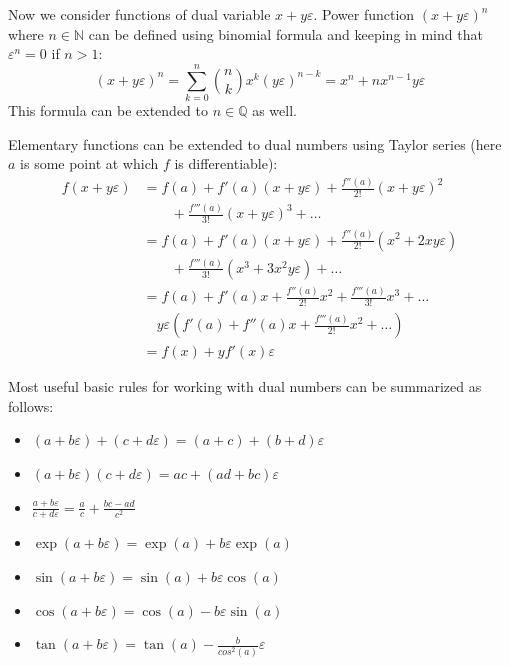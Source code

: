 \documentclass[preprint]{elsarticle}
\begin{document}
Now we consider functions of dual variable $x + y\varepsilon$. Power function
$(x + y\varepsilon)^n$ where $n \in \mathbb{N}$ can be defined using binomial
formula and keeping in mind that $\varepsilon^n = 0$ if $n>1$:
\begin{equation}
  (x + y\varepsilon)^n = \sum_{k=0}^n \binom{n}{k} x^k (y\varepsilon)^{n-k} =
  x^n + n x^{n-1} y \varepsilon
\end{equation}
This formula can be extended to $n \in \mathbb{Q}$ as well.

Elementary functions can be extended to dual numbers using Taylor series (here
$a$ is some point at which $f$ is differentiable):
\begin{equation}
  \begin{aligned}
    f(x + y\varepsilon) &= f(a) + f'(a)(x + y\varepsilon) + \frac{f''(a)}{2!}(x + y\varepsilon)^2 \\
    & \qquad + \frac{f'''(a)}{3!}(x + y\varepsilon)^3 + \dots \\
    &= f(a) + f'(a)(x + y\varepsilon) + \frac{f''(a)}{2!}(x^2 + 2xy\varepsilon) \\
    & \qquad + \frac{f'''(a)}{3!}(x^3 + 3x^2y\varepsilon) + \dots \\
    &= f(a) + f'(a)x + \frac{f''(a)}{2!}x^2 + \frac{f'''(a)}{3!}x^3 + \dots \\
    & \quad y\varepsilon(f'(a) + f''(a)x + \frac{f'''(a)}{2!}x^2 + \dots) \\
    &= f(x) + yf'(x)\varepsilon
  \end{aligned}
\end{equation}

Most useful basic rules for working with dual numbers can be summarized as follows:
\begin{itemize}
\item $(a + b\varepsilon) + (c + d\varepsilon) = (a + c) + (b + d)\varepsilon$
\item $(a + b\varepsilon) (c + d\varepsilon) = ac + (ad + bc)\varepsilon$
\item $\frac{a + b\varepsilon}{c + d\varepsilon} = \frac{a}{c} + \frac{bc - ad}{c^2}$
\item $\exp(a + b\varepsilon) = \exp(a) + b\varepsilon\exp(a)$
\item $\sin(a + b\varepsilon) = \sin(a) + b\varepsilon\cos(a)$
\item $\cos(a + b\varepsilon) = \cos(a) - b\varepsilon\sin(a)$
\item $\tan(a + b\varepsilon) = \tan(a) - \frac{b}{cos^2(a)}\varepsilon$
\end{itemize}
\end{document}
